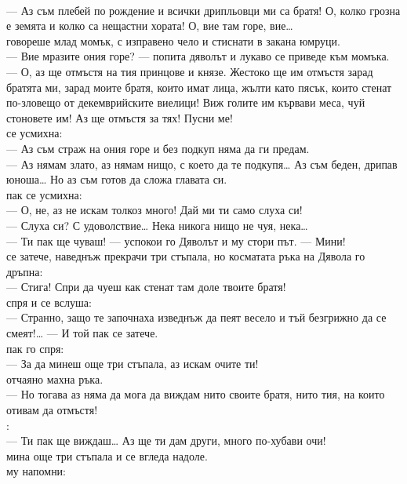 \documentclass[12pt,a4paper]{article}
\begin{document}
\\
— Аз съм плебей по рождение и всички дрипльовци ми са братя! О, колко грозна е земята и колко са нещастни хората! О, вие там горе, вие…
\\
 говореше млад момък, с изправено чело и стиснати в закана юмруци.
\\
— Вие мразите ония горе? — попита дяволът и лукаво се приведе към момъка.
\\
— О, аз ще отмъстя на тия принцове и князе. Жестоко ще им отмъстя зарад братята ми, зарад моите братя, които имат лица, жълти като пясък, които стенат по-зловещо от декемврийските виелици! Виж голите им кървави меса, чуй стоновете им! Аз ще отмъстя за тях! Пусни ме!
\\
 се усмихна:
\\
— Аз съм страж на ония горе и без подкуп няма да ги предам.
\\
— Аз нямам злато, аз нямам нищо, с което да те подкупя… Аз съм беден, дрипав юноша… Но аз съм готов да сложа главата си.
\\
 пак се усмихна:
\\
— О, не, аз не искам толкоз много! Дай ми ти само слуха си!
\\
— Слуха си? С удоволствие… Нека никога нищо не чуя, нека…
\\
— Ти пак ще чуваш! — успокои го Дяволът и му стори път. — Мини!
\\
 се затече, наведнъж прекрачи три стъпала, но косматата ръка на Дявола го дръпна:
\\
— Стига! Спри да чуеш как стенат там доле твоите братя!
\\
 спря и се вслуша:
\\
— Странно, защо те започнаха изведнъж да пеят весело и тъй безгрижно да се смеят!… — И той пак се затече.
\\
 пак го спря:
\\
— За да минеш още три стъпала, аз искам очите ти!
\\
 отчаяно махна ръка.
\\
— Но тогава аз няма да мога да виждам нито своите братя, нито тия, на които отивам да отмъстя!
\\
:
\\
— Ти пак ще виждаш… Аз ще ти дам други, много по-хубави очи!
\\
 мина още три стъпала и се вгледа надоле.
\\
 му напомни:
\end{document}
